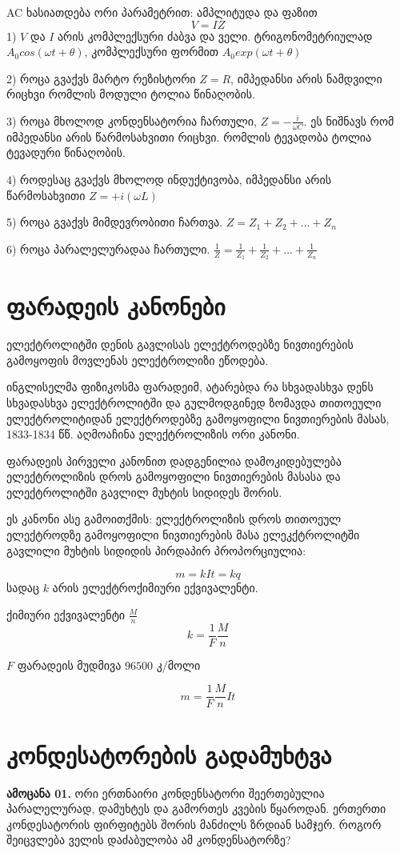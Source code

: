 \documentclass{book}
\begin{document}
AC ხასიათდება ორი პარამეტრით: ამპლიტუდა და ფაზით
$$V = IZ$$
1) $V$ და $I$ არის კომპლექსური ძაბვა და ველი. ტრიგონომეტრიულად $A_0cos(\omega t + \theta)$, კომპლექსური ფორმით $A_0exp(\omega t + \theta)$

2) როცა გვაქვს მარტო რეზისტორი $Z=R$, იმპედანსი არის ნამდვილი რიცხვი რომლის მოდული ტოლია წინაღობის.

3) როცა მხოლოდ კონდენსატორია ჩართული, $Z=-\frac{i}{\omega C}$. ეს ნიშნავს რომ იმპედანსი არის წარმოსახვითი რიცხვი. რომლის ტევადობა ტოლია ტევადური წინაღობის.

4) როდესაც გვაქვს მხოლოდ ინდუქტივობა, იმპედანსი არის წარმოსახვითი $Z = + i(\omega L)$ 

5) როცა გვაქვს მიმდევრობითი ჩართვა. $Z = Z_1 + Z_2 + ... + Z_n$

6) როცა პარალელურადაა ჩართული. $\frac{1}{Z} = \frac{1}{Z_1} + \frac{1}{Z_2} + ... + \frac{1}{Z_n}$

\section{ფარადეის კანონები}

ელექტროლიტში დენის გავლისას ელექტროდებზე ნივთიერების გამოყოფის მოვლენას ელექტროლიზი ეწოდება.

ინგლისელმა ფიზიკოსმა ფარადეიმ, ატარებდა რა სხვადასხვა დენს
სხვადასხვა ელექტროლიტში და გულმოდგინედ ზომავდა თითოეული
ელექტროლიტიდან ელექტროდებზე გამოყოფილი ნივთიერების მასას,
1833-1834 წწ. აღმოაჩინა ელექტროლიზის ორი კანონი.

ფარადეის პირველი კანონით დადგენილია დამოკიდებულება ელექტროლიზის დროს გამოყოფილი ნივთიერების მასასა და ელექტროლიტში გავლილ მუხტის სიდიდეს შორის. 

ეს კანონი ასე გამოითქმის: ელექტროლიზის დროს თითოეულ ელექტროდზე გამოყოფილი ნივთიერების მასა ელეკქტროლიტში გავლილი მუხტის სიდიდის პირდაპირ პროპორციულია:

$$m = kIt = kq$$
სადაც $k$ არის ელექტროქიმიური ექვივალენტი.

ქიმიური ექვივალენტი $\frac{M}{n}$
$$k = \frac{1}{F}\frac{M}{n}$$

$F$ ფარადეის მუდმივა $96500$ კ/მოლი

$$m = \frac{1}{F}\frac{M}{n}It$$

\section{კონდესატორების გადამუხტვა}
\textbf{ამოცანა 01.} ორი ერთნაირი კონდენსატორი შეერთებულია პარალელურად, დამუხტეს და გამორთეს კვების წყაროდან. ერთერთი კონდესატორის ფირფიტებს შორის მანძილს ზრდიან სამჯერ. როგორ შეიცვლება ველის დაძაბულობა ამ კონდენსატორზე?
\end{document}
